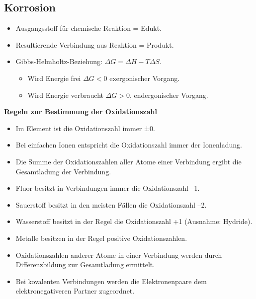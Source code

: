 \documentclass[eglish/german]{latex4ei/latex4ei_sheet}
\begin{document}
	\begin{sectionbox}
		\section{Korrosion}
		\begin{itemize}
			\item Ausgangsstoff für chemische Reaktion = Edukt.
			\item Resultierende Verbindung aus Reaktion = Produkt.
			\item Gibbs-Helmholtz-Beziehung: $\Delta G = \Delta H - T\Delta S$.
			\begin{itemize}
				\item Wird Energie frei $\Delta G < 0$ exergonischer Vorgang.
				\item Wird Energie verbraucht $\Delta G>0$, endergonischer Vorgang. 
			\end{itemize}
		\end{itemize}

		\textbf{Regeln zur Bestimmung der Oxidationszahl}
		\begin{itemize}
			\item Im Element ist die Oxidationszahl immer ±0.
			\item Bei einfachen Ionen entspricht die Oxidationszahl immer der Ionenladung.
			\item Die Summe der Oxidationszahlen aller Atome einer Verbindung ergibt die Gesamtladung der Verbindung.
			\item Fluor besitzt in Verbindungen immer die Oxidationszahl –1.
			\item Sauerstoff besitzt in den meisten Fällen die Oxidationszahl –2.
			\item Wasserstoff besitzt in der Regel die Oxidationszahl +1 (Ausnahme: Hydride).
			\item Metalle besitzen in der Regel positive Oxidationszahlen.
			\item Oxidationszahlen anderer Atome in einer Verbindung werden durch Differenzbildung zur Gesamtladung ermittelt.
			\item Bei kovalenten Verbindungen werden die Elektronenpaare dem elektronegativeren Partner zugeordnet.
		\end{itemize}
		
	\end{sectionbox}
\end{document}
